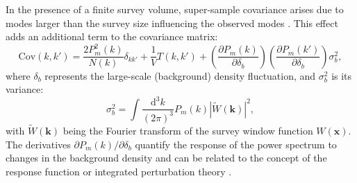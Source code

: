 In the presence of a finite survey volume, super-sample covariance arises due to modes larger than the survey size influencing the observed modes \citep{PhysRevD.87.123504}. This effect adds an additional term to the covariance matrix:
\begin{equation}
    \mathrm{Cov}(k, k') = \frac{2 P_m^2(k)}{N(k)} \delta_{kk'} + \frac{1}{V} T(k, k') + \left( \frac{\partial P_m(k)}{\partial \delta_b} \right) \left( \frac{\partial P_m(k')}{\partial \delta_b} \right) \sigma_b^2,
\end{equation}
where \( \delta_b \) represents the large-scale (background) density fluctuation, and \( \sigma_b^2 \) is its variance:
\begin{equation}
    \sigma_b^2 = \int \frac{\mathrm{d}^3 k}{(2\pi)^3} P_m(k) |\tilde{W}(\mathbf{k})|^2,
\end{equation}
with \( \tilde{W}(\mathbf{k}) \) being the Fourier transform of the survey window function \( W(\mathbf{x}) \).
The derivatives \( \partial P_m(k) / \partial \delta_b \) quantify the response of the power spectrum to changes in the background density and can be related to the concept of the response function or integrated perturbation theory \citep{2014PhRvD..89h3519L}.


